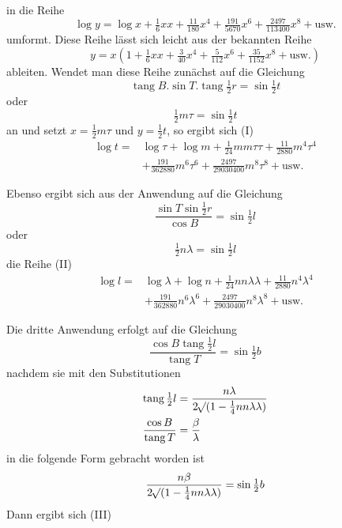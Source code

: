 %
in die Reihe
\[
\log y=\log x+\tfrac16xx+\tfrac{11}{180}x^4+\tfrac{191}{5670}x^6+\tfrac{2497}{113400}x^8+\text{usw.}
\]
umformt. Diese Reihe lässt sich leicht aus der bekannten Reihe
\[
y=x(1+\tfrac16xx+\tfrac3{40}x^4+\tfrac5{112}x^6+\tfrac{35}{1152}x^8+\text{usw.})
\]
ableiten. Wendet man diese Reihe zunächst auf die Gleichung
\[
\operatorname{tang}B\mathord{.}\sin T\mathord{.}\operatorname{tang}\tfrac12r=\sin\tfrac12t
\]
oder
\[
\tfrac12m\tau=\sin\tfrac12t
\]
an und setzt \(x=\frac12m\tau\) und \(y=\frac12t\), so ergibt sich (I)
\[
\begin{aligned}
\log t={}&\log\tau+\log m+\tfrac1{24}mm\tau\tau+\tfrac{11}{2880}m^4\tau^4\\
&+\tfrac{191}{362880}m^6\tau^6+\tfrac{2497}{29030400}m^8\tau^8+\text{usw.}
\end{aligned}
\]

\indent Ebenso ergibt sich aus der Anwendung auf die Gleichung
\[
\frac{\sin T\sin\frac12r}{\cos B}=\sin\tfrac12l
\]
oder
\[
\tfrac12n\lambda=\sin\tfrac12l
\]
die Reihe (II)
\[
\begin{aligned}
\log l={}&\log\lambda+\log n+\tfrac1{24}nn\lambda\lambda+\tfrac{11}{2880}n^4\lambda^4\\
&+\tfrac{191}{362880}n^6\lambda^6+\tfrac{2497}{29030400}n^8\lambda^8+\text{usw.}
\end{aligned}
\]

\indent Die dritte Anwendung erfolgt auf die Gleichung
\[
\frac{\cos B\operatorname{tang}\frac12l}{\operatorname{tang}T}=\sin\tfrac12b
\]
nachdem sie mit den Substitutionen
\[
\begin{aligned}
\operatorname{tang}\tfrac12l&=\frac{n\lambda}{2\mathord{{}^{}\!\surd}(1-\frac14nn\lambda\lambda)}\\
\frac{\cos B}{\operatorname{tang}T}&=\frac\beta\lambda
\end{aligned}
\]
in die folgende Form gebracht worden ist
\[
\frac{n\beta}{2\mathord{{}^{}\!\surd}(1-\frac14nn\lambda\lambda)}=\sin\tfrac12b
\]
Dann ergibt sich (III)
